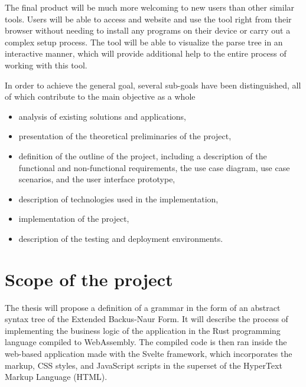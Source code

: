 \documentclass[english,engineering]{wizthesis}
\begin{document}
The final product will be much more welcoming to new users than other similar
tools. Users will be able to access and website and use the tool right from
their browser without needing to install any programs on their device or carry
out a complex setup process. The tool will be able to visualize the parse tree
in an interactive manner, which will provide additional help to the entire
process of working with this tool.

In order to achieve the general goal, several sub-goals have been
distinguished, all of which contribute to the main objective as a whole
\begin{itemize}
  \item analysis of existing solutions and applications,
  \item presentation of the theoretical preliminaries of the project,
  \item definition of the outline of the project, including a description of the
  functional and non-functional requirements, the use case diagram, use case
  scenarios, and the user interface prototype,
  \item description of technologies used in the implementation,
  \item implementation of the project,
  \item description of the testing and deployment environments.
\end{itemize}

\section{Scope of the project}

The thesis will propose a definition of a grammar in the form of an abstract
syntax tree of the Extended Backus-Naur Form. It will describe the process of
implementing the business logic of the application in the Rust programming
language compiled to WebAssembly. The compiled code is then ran inside the
web-based application made with the Svelte framework, which incorporates the
markup, CSS styles, and JavaScript scripts in the superset of the HyperText
Markup Language (HTML).
\end{document}
